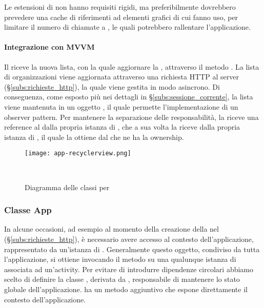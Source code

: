 \documentclass[../../manuale-manutentore.tex]{subfiles}
\begin{document}
Le estensioni di  non hanno requisiti rigidi, ma preferibilmente dovrebbero prevedere una cache di riferimenti ad elementi grafici di cui fanno uso, per limitare il numero di chiamate a , le quali potrebbero rallentare l'applicazione.

\paragraph{Integrazione con MVVM}%
\label{par:integrazione_con_mvvm}

Il  riceve la nuova lista, con la quale aggiornare la , attraverso il metodo \linebreak{}.
La lista di organizzazioni viene aggiornata attraverso una richiesta HTTP al server (§\ref{subs:richieste_http}), la quale viene gestita in modo asincrono.
Di conseguenza, come esposto più nei dettagli in §\ref{subs:sessione_corrente}, la lista viene mantenuta in un oggetto , il quale permette l'implementazione di un observer pattern.
Per mantenere la separazione delle responsabilità, la  riceve una reference al  dalla propria istanza di , che a sua volta la riceve dalla propria istanza di , il quale la ottiene dal  che ne ha la ownership.

\begin{figure}[ht]
  \centering
  \texttt{[image: app-recyclerview.png]}
  \caption{Diagramma delle classi per }
~~\label{fig:app/diagramma_classi_recyclerview}
\end{figure}

\subsubsection{Classe App}%
\label{subs:classe_app}

In alcune occasioni, ad esempio al momento della creazione della  nel  (§\ref{subs:richieste_http}), è necessario avere accesso al contesto dell'applicazione, rappresentato da un'istanza di .
Generalmente questo oggetto, condiviso da tutta l'applicazione, si ottiene invocando il metodo  su una qualunque istanza di  associata ad un'activity.
Per evitare di introdurre dipendenze circolari abbiamo scelto di definire la classe , derivata da , responsabile di mantenere lo stato globale dell'applicazione.
 ha un metodo aggiuntivo  che espone direttamente il contesto dell'applicazione.
\end{document}
